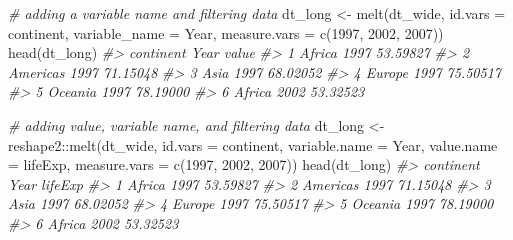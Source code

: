 \documentclass[
]{book}
\newenvironment{Shaded}{\begin{snugshade}}{\end{snugshade}}
\newcommand{\AttributeTok}[1]{\textcolor[rgb]{0.77,0.63,0.00}{#1}}
\newcommand{\CommentTok}[1]{\textcolor[rgb]{0.56,0.35,0.01}{\textit{#1}}}
\newcommand{\FunctionTok}[1]{\textcolor[rgb]{0.00,0.00,0.00}{#1}}
\newcommand{\NormalTok}[1]{#1}
\newcommand{\OtherTok}[1]{\textcolor[rgb]{0.56,0.35,0.01}{#1}}
\newcommand{\SpecialCharTok}[1]{\textcolor[rgb]{0.00,0.00,0.00}{#1}}
\newcommand{\StringTok}[1]{\textcolor[rgb]{0.31,0.60,0.02}{#1}}
\begin{document}
\begin{Shaded}
\begin{Highlighting}[]
\CommentTok{\# adding a variable name and filtering data}
\NormalTok{dt\_long }\OtherTok{\textless{}{-}} \FunctionTok{melt}\NormalTok{(dt\_wide, }
                \AttributeTok{id.vars =} \StringTok{\textquotesingle{}continent\textquotesingle{}}\NormalTok{, }
                \AttributeTok{variable\_name =} \StringTok{\textquotesingle{}Year\textquotesingle{}}\NormalTok{,}
                \AttributeTok{measure.vars =} \FunctionTok{c}\NormalTok{(}\StringTok{\textquotesingle{}1997\textquotesingle{}}\NormalTok{, }\StringTok{\textquotesingle{}2002\textquotesingle{}}\NormalTok{, }\StringTok{\textquotesingle{}2007\textquotesingle{}}\NormalTok{))}
\FunctionTok{head}\NormalTok{(dt\_long)}
\CommentTok{\#\textgreater{}   continent Year    value}
\CommentTok{\#\textgreater{} 1    Africa 1997 53.59827}
\CommentTok{\#\textgreater{} 2  Americas 1997 71.15048}
\CommentTok{\#\textgreater{} 3      Asia 1997 68.02052}
\CommentTok{\#\textgreater{} 4    Europe 1997 75.50517}
\CommentTok{\#\textgreater{} 5   Oceania 1997 78.19000}
\CommentTok{\#\textgreater{} 6    Africa 2002 53.32523}

\CommentTok{\# adding value, variable name, and filtering data}
\NormalTok{dt\_long }\OtherTok{\textless{}{-}}\NormalTok{ reshape2}\SpecialCharTok{::}\FunctionTok{melt}\NormalTok{(dt\_wide, }
                          \AttributeTok{id.vars =} \StringTok{\textquotesingle{}continent\textquotesingle{}}\NormalTok{, }
                          \AttributeTok{variable.name =} \StringTok{\textquotesingle{}Year\textquotesingle{}}\NormalTok{,}
                          \AttributeTok{value.name =} \StringTok{\textquotesingle{}lifeExp\textquotesingle{}}\NormalTok{, }
                          \AttributeTok{measure.vars =} \FunctionTok{c}\NormalTok{(}\StringTok{\textquotesingle{}1997\textquotesingle{}}\NormalTok{, }\StringTok{\textquotesingle{}2002\textquotesingle{}}\NormalTok{, }\StringTok{\textquotesingle{}2007\textquotesingle{}}\NormalTok{))}
\FunctionTok{head}\NormalTok{(dt\_long)}
\CommentTok{\#\textgreater{}   continent Year  lifeExp}
\CommentTok{\#\textgreater{} 1    Africa 1997 53.59827}
\CommentTok{\#\textgreater{} 2  Americas 1997 71.15048}
\CommentTok{\#\textgreater{} 3      Asia 1997 68.02052}
\CommentTok{\#\textgreater{} 4    Europe 1997 75.50517}
\CommentTok{\#\textgreater{} 5   Oceania 1997 78.19000}
\CommentTok{\#\textgreater{} 6    Africa 2002 53.32523}
\end{Highlighting}
\end{Shaded}
\end{document}

